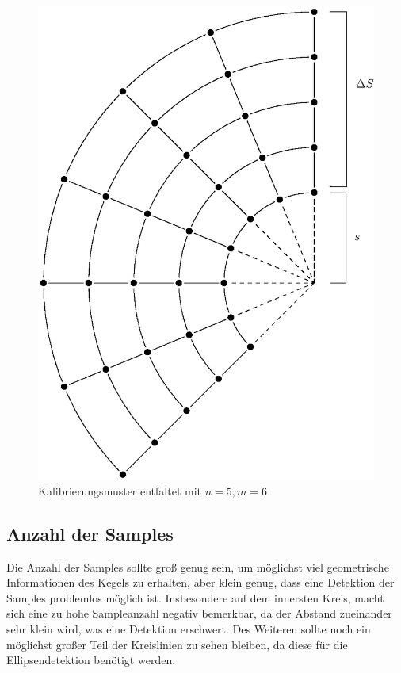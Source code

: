 \begin{figure}[!htb]
	\centering
	\includegraphics[scale=.7]{images/calibrationPattern2.eps}
	\caption{Kalibrierungsmuster entfaltet mit $n = 5, m = 6$}
	\label{fig:calibrationPattern}
\end{figure}


\subsection{Anzahl der Samples}
Die Anzahl der Samples sollte groß genug sein, um möglichst viel geometrische Informationen des Kegels zu erhalten, aber klein genug, dass eine Detektion der Samples problemlos möglich ist. Insbesondere auf dem innersten Kreis, macht sich eine zu hohe Sampleanzahl negativ bemerkbar, da der Abstand zueinander sehr klein wird, was eine Detektion erschwert. Des Weiteren sollte noch ein möglichst großer Teil der Kreislinien zu sehen bleiben, da diese für die Ellipsendetektion benötigt werden. 


